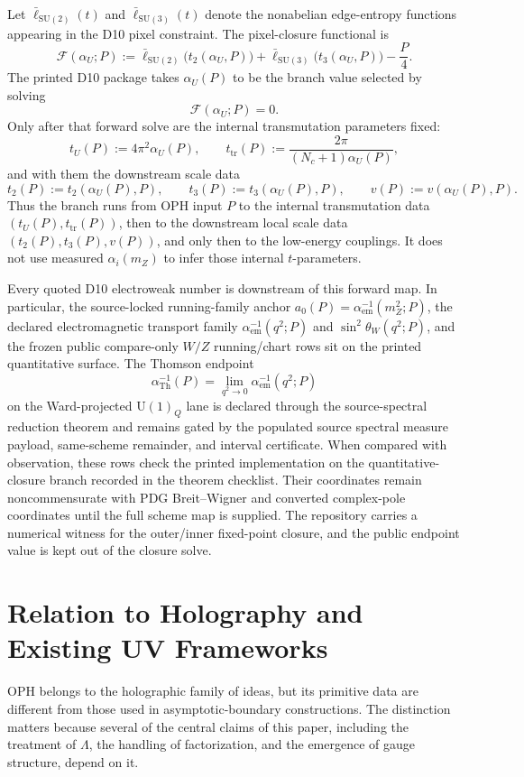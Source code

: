 \documentclass[11pt]{article}
\newcommand{\SU}{\mathrm{SU}}
\newcommand{\U}{\mathrm{U}}
\begin{document}
Let \(\bar\ell_{\SU(2)}(t)\) and \(\bar\ell_{\SU(3)}(t)\) denote the nonabelian edge-entropy functions appearing in the D10 pixel constraint. The pixel-closure functional is
\[
\mathcal F(\alpha_U;P)
:=
\bar\ell_{\SU(2)}\!\bigl(t_2(\alpha_U,P)\bigr)
+
\bar\ell_{\SU(3)}\!\bigl(t_3(\alpha_U,P)\bigr)
-\frac{P}{4}.
\]
The printed D10 package takes \(\alpha_U(P)\) to be the branch value selected by solving
\[
\mathcal F(\alpha_U;P)=0.
\]
Only after that forward solve are the internal transmutation parameters fixed:
\[
t_U(P):=4\pi^2\alpha_U(P),
\qquad
t_{\mathrm{tr}}(P):=\frac{2\pi}{(N_c+1)\alpha_U(P)},
\]
and with them the downstream scale data
\[
t_2(P):=t_2(\alpha_U(P),P),
\qquad
t_3(P):=t_3(\alpha_U(P),P),
\qquad
v(P):=v(\alpha_U(P),P).
\]
Thus the branch runs from OPH input \(P\) to the internal transmutation data
\((t_U(P),t_{\mathrm{tr}}(P))\), then to the downstream local scale data
\((t_2(P),t_3(P),v(P))\), and only then to the low-energy couplings. It does not use measured
\(\alpha_i(m_Z)\) to infer those internal \(t\)-parameters.

Every quoted D10 electroweak number is downstream of this forward map. In particular, the
source-locked running-family anchor \(a_0(P)=\alpha_{\mathrm{em}}^{-1}(m_Z^2;P)\), the
declared electromagnetic transport family \(\alpha_{\mathrm{em}}^{-1}(q^2;P)\) and \(\sin^2\theta_W(q^2;P)\), and the frozen public
compare-only \(W/Z\) running/chart rows sit on the printed quantitative surface. The Thomson endpoint
\[
\alpha_{\mathrm{Th}}^{-1}(P)=\lim_{q^2\to0}\alpha_{\mathrm{em}}^{-1}(q^2;P)
\]
on the Ward-projected \(\U(1)_Q\) lane is declared through the
source-spectral reduction theorem and remains gated by the populated source
spectral measure payload, same-scheme remainder, and interval certificate. When compared with
observation, these rows check the printed implementation on the quantitative-closure branch recorded
in the theorem checklist. Their coordinates remain noncommensurate with PDG Breit--Wigner and
converted complex-pole coordinates until the full scheme map is supplied. The repository
carries a numerical witness for the outer/inner fixed-point closure, and the public endpoint
value is kept out of the closure solve.

\section{Relation to Holography and Existing UV Frameworks}

OPH belongs to the holographic family of ideas, but its primitive data are different from those used in asymptotic-boundary constructions. The distinction matters because several of the central claims of this paper, including the treatment of $\Lambda$, the handling of factorization, and the emergence of gauge structure, depend on it.
\end{document}
